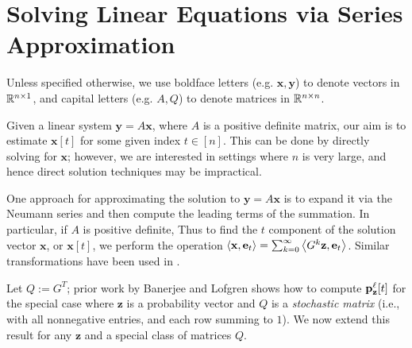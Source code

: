 \section{Solving Linear Equations via Series Approximation}
\label{sec:linsolve}

Unless specified otherwise, we use boldface letters (e.g. $\mathbf{x},\mathbf{y}$) to denote vectors in $\mathbb{R}^{n\times 1}$, and capital letters (e.g. $A,Q$) to denote matrices in $\mathbb{R}^{n\times n}$.


Given a linear system $\mathbf{y} = A\mathbf{x}$, where $A$ is a positive definite matrix, our aim is to estimate $\mathbf{x}[t]$ for some given index $t\in[n]$. 
This can be done by directly solving for $\mathbf{x}$; however, we are interested in settings where $n$ is very large, and hence direct solution techniques may be impractical. 

One approach for approximating the solution to $\mathbf{y} = A\mathbf{x}$ is to expand it via the Neumann series and then compute the leading terms of the summation.
In particular, if $A$ is positive definite, 
Thus to find the $t$ component of the solution vector $\mathbf{x}$, or $\mathbf{x}[t]$, we perform the operation $\left< \mathbf{x}, \mathbf{e}_t \right> = \sum_{k=0}^\infty \left< G^k \mathbf{z}, \mathbf{e}_t \right>$. 
Similar transformations have been used in \cite{dimov2015new, lee2014asynchronous, wu2016multi}.

Let $Q:=G^T$; prior work by Banerjee and Lofgren \cite{banerjee2015fast} shows how to compute ${\mathbf{p}}_\mathbf{z}^{\ell}[t]$ for the special case where $\mathbf{z}$ is a probability vector and $Q$ is a \emph{stochastic matrix} (i.e., with all nonnegative entries, and each row summing to $1$). 
We now extend this result for any $\mathbf{z}$ and a special class of matrices $Q$.

